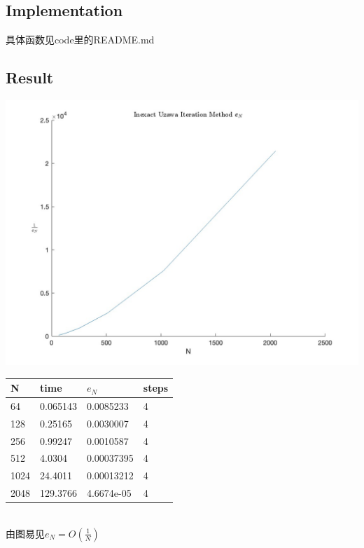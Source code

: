 \documentclass{article}
\begin{document}
\subsection{Implementation}
具体函数见code里的README.md\\
\subsection{Result}
\includegraphics[scale=0.3]{image/IUIM.jpg}\\
\begin{tabular}{llll}
N & time & $e_N$ & steps \\ 
\hline 
64 & 0.065143 & 0.0085233 & 4 \\ 
128 & 0.25165 & 0.0030007 & 4 \\ 
256 & 0.99247 & 0.0010587 & 4 \\ 
512 & 4.0304 & 0.00037395 & 4 \\ 
1024 & 24.4011 & 0.00013212 & 4 \\ 
2048 & 129.3766 & 4.6674e-05 & 4 \\ 
\hline 
\end{tabular}\\
由图易见$e_N=O(\frac{1}{N})$
\end{document}
